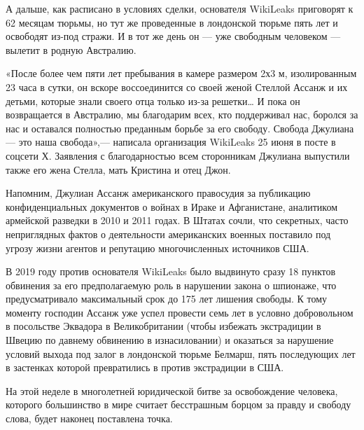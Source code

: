 \begin{fancyquotes}
    А дальше, как расписано в условиях сделки, основателя WikiLeaks приговорят к 62 месяцам тюрьмы, но тут же  проведенные в лондонской тюрьме пять лет и освободят из-под стражи. И в тот же день он --- уже свободным человеком --- вылетит в родную Австралию.
\end{fancyquotes}

«После более чем пяти лет пребывания в камере размером 2х3 м, изолированным 23 часа в сутки, он вскоре воссоединится со своей женой Стеллой Ассанж и их детьми, которые знали своего отца только из-за решетки… И пока он возвращается в Австралию, мы благодарим всех, кто поддерживал нас, боролся за нас и оставался полностью преданным борьбе за его свободу. Свобода Джулиана — это наша свобода»,--- написала организация WikiLeaks 25 июня в посте в соцсети Х. Заявления с благодарностью всем сторонникам Джулиана выпустили также его жена Стелла, мать Кристина и отец Джон.

\begin{fancyquotes}
    Напомним, Джулиан Ассанж  американского правосудия за публикацию конфиденциальных документов о войнах в Ираке и Афганистане,  аналитиком армейской разведки в 2010 и 2011 годах. В Штатах сочли, что  секретных, часто неприглядных фактов о деятельности американских военных поставило под угрозу жизни агентов и репутацию многочисленных источников США.
\end{fancyquotes}

В 2019 году против основателя WikiLeaks было выдвинуто сразу 18 пунктов обвинения за его предполагаемую роль в нарушении закона о шпионаже, что предусматривало максимальный срок до 175 лет лишения свободы. К тому моменту господин Ассанж уже успел провести семь лет в условно добровольном  в посольстве Эквадора в Великобритании (чтобы избежать экстрадиции в Швецию по давнему обвинению в изнасиловании) и оказаться за нарушение условий выхода под залог в лондонской тюрьме Белмарш, пять последующих лет в застенках которой превратились в  против экстрадиции в США.

На этой неделе в многолетней юридической битве за освобождение человека, которого большинство в мире считает бесстрашным борцом за правду и свободу слова, будет наконец поставлена точка.

